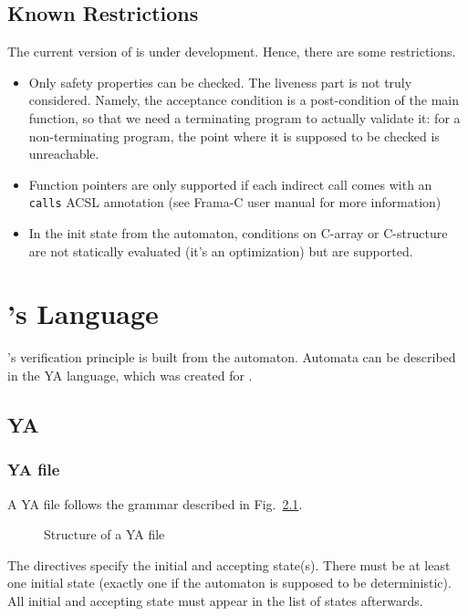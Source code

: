\documentclass{frama-c-book}
\begin{document}
\section{Known Restrictions}

The current version of \aorai is under development. Hence, there are
some restrictions.
\begin{itemize}
\item Only safety properties can be checked. The liveness
  part is not truly considered. Namely, the acceptance condition is a post-condition
  of the main function, so that we need a terminating program to actually validate
  it: for a non-terminating program, the point where it is supposed to be checked is
  unreachable.
  \item Function pointers are only supported if each indirect call comes with
    an \lstinline|calls| ACSL annotation (see Frama-C user manual for more information)
  \item In the init state from the automaton, conditions on C-array or
    C-structure are not statically evaluated (it's an optimization)
    but are supported.
\end{itemize}


\chapter{\aorai's Language}
\aorai's verification principle is built from the
automaton. Automata can be described in the YA language, which was created for \aorai.

\section{YA}
\label{sec:ya}
\lstset{language=ya}
\subsection{YA file}\label{sec:ya-file}
A YA file follows the grammar described in Fig.~\ref{ya-file}.
\begin{figure}[htb]

\caption{Structure of a YA file}\label{ya-file}
\end{figure}
The directives specify the initial and accepting state(s). There must be at
least one initial state (exactly one if the automaton is supposed to be
deterministic). All initial and accepting state must appear in the list of
states afterwards.
\end{document}
